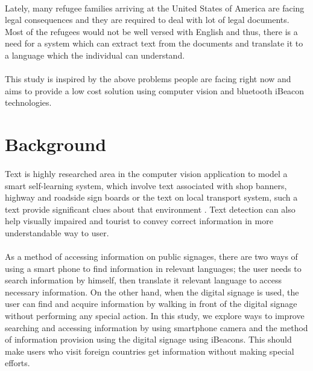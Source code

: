 \documentclass[12pt]{article}
\begin{document}
\paragraph{} Lately, many refugee families arriving at the United States of America are facing legal consequences and they are required to deal with lot of legal documents. Most of the refugees would not be well versed with English and thus, there is a need for a system which can extract text from the documents and translate it to a language which the individual can understand. 

\paragraph{}This study is inspired by the above problems people are facing right now and aims to provide a low cost solution using computer vision and bluetooth iBeacon technologies.




\section{Background}
\label{sect-background}

\paragraph{}Text is highly researched area in the computer vision application to model a smart self-learning system, which involve text associated with shop banners, highway and roadside sign boards or the text on local transport system, such a text provide significant clues about that environment \cite{india}. Text detection can also help visually impaired and tourist to convey correct information in more understandable way to user.\cite{india}

\paragraph{}As a method of accessing information on public signages, there are two ways of using a smart phone to find information in relevant languages; the user needs to search information by himself, then translate it relevant language to access necessary information. On the other hand, when the digital signage is used, the user can find and acquire information by walking in front of the digital signage without performing any special action. In this study, we explore ways to improve searching and accessing information by using smartphone camera and the method of information provision using the digital signage using iBeacons. This should make users who visit foreign countries get information without making special efforts. 
\end{document}
